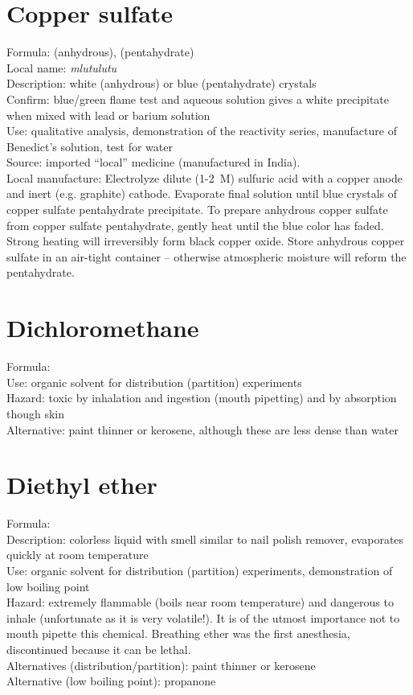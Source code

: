 \section{Copper sulfate}
\label{sec:}
Formula:  (anhydrous), 
 (pentahydrate)\\
Local name: \textit{mlutulutu}\\
Description: white (anhydrous) or blue (pentahydrate) crystals\\
Confirm: blue/green flame test 
and aqueous solution gives a white precipitate 
when mixed with lead or barium solution\\
Use: qualitative analysis, 
demonstration of the reactivity series, 
manufacture of Benedict's solution, 
test for water\\
Source: imported ``local'' medicine (manufactured in India).\\ 
Local manufacture: Electrolyze dilute (1-2~M) sulfuric acid 
with a copper anode and inert (e.g. 
graphite) cathode. 
Evaporate final solution until 
blue crystals of copper sulfate pentahydrate precipitate. 
To prepare anhydrous copper sulfate from copper sulfate pentahydrate, 
gently heat until the blue color has faded. 
Strong heating will irreversibly form black copper oxide. 
Store anhydrous copper sulfate in an air-tight container -- 
otherwise atmospheric moisture will reform the pentahydrate.

\section{Dichloromethane}
\label{sec:}
Formula: \\
Use: organic solvent for distribution (partition) experiments\\
Hazard: toxic by inhalation and ingestion (mouth pipetting) 
and by absorption though skin\\
Alternative: paint thinner or kerosene, 
although these are less dense than water

\section{Diethyl ether}
\label{sec:}
Formula: \\
Description: colorless liquid with smell similar to nail polish remover, 
evaporates quickly at room temperature\\
Use: organic solvent for distribution (partition) experiments, 
demonstration of low boiling point\\
Hazard: extremely flammable (boils near room temperature) 
and dangerous to inhale (unfortunate as it is very volatile!). 
It is of the utmost importance not to mouth pipette this chemical. 
Breathing ether was the first anesthesia, 
discontinued because it can be lethal.\\
Alternatives (distribution/partition): paint thinner or kerosene\\
Alternative (low boiling point): propanone

